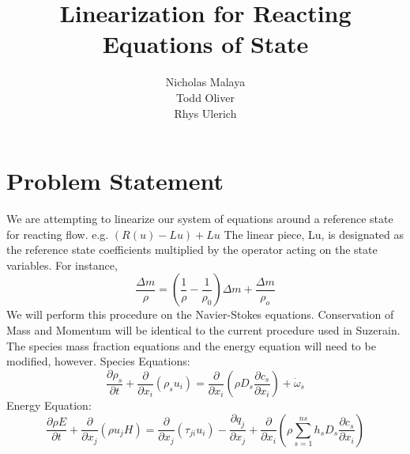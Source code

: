 \documentclass[10pt]{article}
\title{Linearization for Reacting Equations of State}
\author{Nicholas Malaya \\
        Todd Oliver \\ 
	Rhys Ulerich \\ }
\begin{document}
\maketitle

\section{Problem Statement}

We are attempting to linearize our system of equations around a
reference state for reacting flow. e.g. $(R(u)-Lu) + Lu$
The linear piece, Lu, is designated as the reference state coefficients
multiplied by the operator acting on the state variables. For instance,
\begin{equation}
 \frac{\Delta m}{\rho} = (\frac{1}{\rho}-\frac{1}{\rho_0})\Delta m +
  \frac{\Delta m}{\rho_o}
\end{equation}
We will perform this procedure on the Navier-Stokes
equations. Conservation of Mass and Momentum will be identical to the
current procedure used in Suzerain. The species mass
fraction equations and the energy equation will need to be modified, however. 
\newline
\newline
Species Equations:
\begin{equation}
 \frac{\partial \rho_s}{\partial t} + \frac{\partial}{\partial
  x_i}(\rho_s u_i) = \frac{\partial}{\partial x_i}(\rho D_s
  \frac{\partial c_s}{\partial x_i}) + \dot \omega_s
\end{equation}
\newline
\newline
Energy Equation:
\begin{equation}
\frac{\partial \rho E}{\partial t} + \frac{\partial }{\partial x_j}(\rho
u_j H) = \frac{\partial }{\partial x_j}(\tau_{ji}u_i) - \frac{\partial
q_j}{\partial x_j} + \frac{\partial }{\partial x_i}(\rho \sum^{ns}_{s=1}
h_s D_s \frac{\partial c_s}{\partial x_i})
\end{equation}
\end{document}
